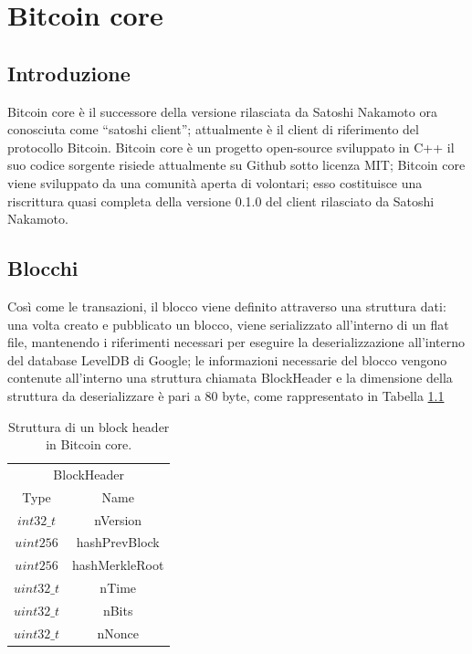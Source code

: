\chapter{Bitcoin core}
\label{chap:bitcoin core}

\section{Introduzione}
\label{sec:introduzionebitcoincore}

Bitcoin core è il successore della versione rilasciata da Satoshi Nakamoto ora conosciuta come “satoshi client”; attualmente è il client di riferimento del protocollo Bitcoin.
Bitcoin core è un progetto open-source sviluppato in C++ il suo codice sorgente risiede attualmente su Github sotto licenza MIT; Bitcoin core viene sviluppato da una comunità aperta di volontari; esso costituisce una riscrittura quasi completa della versione 0.1.0 del client rilasciato da Satoshi Nakamoto.

\section{Blocchi}
\label{sec:blocchibitcoincore}

Così come le transazioni, il blocco viene definito attraverso una struttura dati: una volta creato e pubblicato un blocco, viene serializzato all’interno di un flat file, mantenendo i riferimenti necessari per eseguire la deserializzazione all’interno del database LevelDB di Google; le informazioni necessarie del blocco vengono contenute all’interno una struttura chiamata BlockHeader e la dimensione della struttura da deserializzare è pari a 80 byte, come rappresentato in Tabella \ref{tab:blockheaderbitcoinc}

\begin{table}
       \centering\small
           \begin{tabular}{cc}
               \toprule
                 \multicolumn{2}{c}{BlockHeader} \\
                 \cmidrule(lr){1-2}
                 \multicolumn{1}{c}{Type} & \multicolumn{1}{c}{Name} \\
               \midrule
               $int32\_t$ & nVersion   \\
               $uint256$ & hashPrevBlock \\
               $uint256$ & hashMerkleRoot \\
               $uint32\_t$ & nTime \\
               $uint32\_t$ & nBits \\
               $uint32\_t$ & nNonce \\
               \bottomrule
       \end{tabular}
       \caption{Struttura di un block header in Bitcoin core.\label{tab:blockheaderbitcoinc}}
   \end{table}


